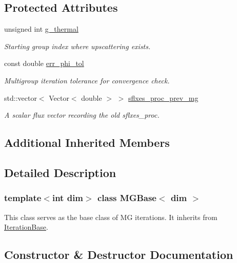 \subsection*{Protected Attributes}
\begin{DoxyCompactItemize}
\item 
unsigned int \hyperlink{class_m_g_base_a7df1f6ce51cf6eb033420be98b1f0019}{g\+\_\+thermal}
\begin{DoxyCompactList}\small\item\em Starting group index where upscattering exists. \end{DoxyCompactList}\item 
const double \hyperlink{class_m_g_base_af50b1bdc92270c342524eacfc644170c}{err\+\_\+phi\+\_\+tol}
\begin{DoxyCompactList}\small\item\em Multigroup iteration tolerance for convergence check. \end{DoxyCompactList}\item 
std\+::vector$<$ Vector$<$ double $>$ $>$ \hyperlink{class_m_g_base_ad8a9d4163bb31470fff74fe787c23788}{sflxes\+\_\+proc\+\_\+prev\+\_\+mg}
\begin{DoxyCompactList}\small\item\em A scalar flux vector recording the old sflxes\+\_\+proc. \end{DoxyCompactList}\end{DoxyCompactItemize}
\subsection*{Additional Inherited Members}


\subsection{Detailed Description}
\subsubsection*{template$<$int dim$>$\newline
class M\+G\+Base$<$ dim $>$}

This class serves as the base class of MG iterations. It inherits from \hyperlink{class_iteration_base}{Iteration\+Base}. 

\subsection{Constructor \& Destructor Documentation}
\mbox{\label{class_m_g_base_ad938184229e773a339be9ba1fc487aa1}} 
